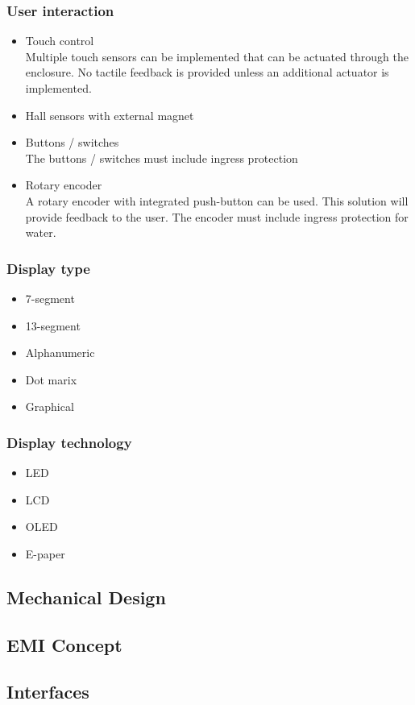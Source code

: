 \subsubsection{User interaction}
\begin{itemize}
     \item Touch control
        \\
        Multiple touch sensors can be implemented that can be actuated through the enclosure. No tactile feedback is provided unless an additional actuator is implemented. 
    \item Hall sensors with external magnet
        \\
    \item Buttons / switches
        \\
        The buttons / switches must include ingress protection
    \item Rotary encoder
        \\
        A rotary encoder with integrated push-button can be used. This solution will provide feedback to the user. The encoder must include ingress protection for water. 
\end{itemize}

\subsubsection{Display type}
\begin{itemize}
     \item 7-segment
        \\
    \item 13-segment
        \\
    \item Alphanumeric
        \\
    \item Dot marix
        \\
    \item Graphical
        \\
\end{itemize}

\subsubsection{Display technology}
\begin{itemize}
     \item LED
        \\
    \item LCD
        \\
    \item OLED
        \\
    \item E-paper
        \\
\end{itemize}

\subsection{Mechanical Design}

\FloatBarrier
\subsection{EMI Concept}

\FloatBarrier
\subsection{Interfaces}

